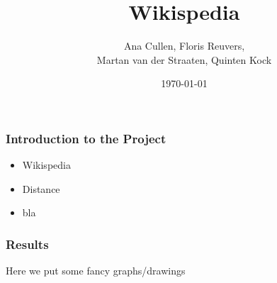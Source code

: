 \documentclass{beamer}
\title{Wikispedia}
\author{Ana Cullen, Floris Reuvers, \\
Martan van der Straaten, Quinten Kock}
\date{\today}
\begin{document}
\frame{\titlepage}

\begin{frame}
\frametitle{Introduction to the Project}
\begin{itemize}
    \item Wikispedia
    \item Distance
    \item bla
\end{itemize}
\end{frame}

\begin{frame}
\frametitle{Results}
Here we put some fancy graphs/drawings
\end{frame}
\end{document}
